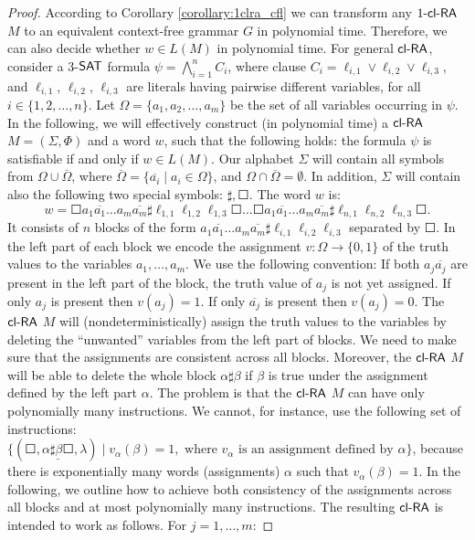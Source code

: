 \begin{proof}
According to Corollary \ref{corollary:1clra_cfl} we can transform any $\kclRA[1]$ $M$ to an equivalent context-free grammar $G$ in polynomial time. Therefore, we can also decide whether $w \in L(M)$ in polynomial time. For general $\clRA$, consider a $3$-$\SAT$ formula $\psi = \bigwedge_{i=1}^n C_i$, where clause $C_i = \ell_{i,1} \vee \ell_{i,2} \vee \ell_{i,3}$, and $\ell_{i,1}$, $\ell_{i,2}$, $\ell_{i,3}$ are literals having pairwise different variables, for all $i \in \{1, 2, \ldots, n\}$. Let $\Omega = \{a_1, a_2, \ldots, a_m\}$ be the set of all variables occurring in $\psi$. In the following, we will effectively construct (in polynomial time) a $\clRA$ $M = (\Sigma, \Phi)$ and a word $w$, such that the following holds: the formula $\psi$ is satisfiable if and only if $w \in L(M)$. Our alphabet $\Sigma$ will contain all symbols from $\Omega \cup \overline{\Omega}$, where $\overline{\Omega} = \{ \overline{a_i} \mid a_i \in \Omega \}$, and $\Omega \cap \overline{\Omega} = \emptyset$. In addition, $\Sigma$ will contain also the following two special symbols: $\sharp, \Square$. The word $w$ is:
$$w = \Square a_1 \overline{a_1} \ldots a_m \overline{a_m} \sharp \ell_{1,1} \ell_{1,2} \ell_{1,3} \Square \ldots \Square a_1 \overline{a_1} \ldots a_m \overline{a_m} \sharp \ell_{n,1} \ell_{n,2} \ell_{n,3} \Square.$$
It consists of $n$ blocks of the form $a_1 \overline{a_1} \ldots a_m \overline{a_m} \sharp \ell_{i,1} \ell_{i,2} \ell_{i,3}$ separated by $\Square$. In the left part of each block we encode the assignment $v: \Omega \to \{0, 1\}$ of the truth values to the variables $a_1, \ldots, a_m$. We use the following convention: If both $a_j \overline{a_j}$ are present in the left part of the block, the truth value of $a_j$ is not yet assigned. If only $a_j$ is present then $v(a_j) = 1$. If only $\overline{a_j}$ is present then $v(a_j) = 0$. The $\clRA$ $M$ will (nondeterministically) assign the truth values to the variables by deleting the ``unwanted'' variables from the left part of blocks. We need to make sure that the assignments are consistent across all blocks. Moreover, the $\clRA$ $M$ will be able to delete the whole block $\alpha \sharp \beta$ if $\beta$ is true under the assignment defined by the left part $\alpha$. The problem is that the $\clRA$ $M$ can have only polynomially many instructions. We cannot, for instance, use the following set of instructions: $\{ (\Square, \underline{\alpha \sharp \beta \Square}, \lambda) \mid v_{\alpha}(\beta) = 1, \text{ where } v_{\alpha} \text{ is an assignment defined by } \alpha\}$, because there is exponentially many words (assignments) $\alpha$ such that $v_{\alpha}(\beta) = 1$. In the following, we outline how to achieve both consistency of the assignments across all blocks and at most polynomially many instructions. The resulting $\clRA$ is intended to work as follows. For $j = 1, \ldots, m$:

\end{proof}
